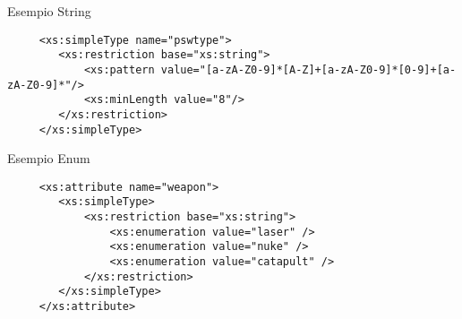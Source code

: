 \documentclass{beamer}
\begin{document}
   \begin{frame}[containsverbatim]
   \begin{block}{Esempio String}
      \begin{lstlisting}
     <xs:simpleType name="pswtype">
     	<xs:restriction base="xs:string">
     		<xs:pattern value="[a-zA-Z0-9]*[A-Z]+[a-zA-Z0-9]*[0-9]+[a-zA-Z0-9]*"/>
     		<xs:minLength value="8"/>
     	</xs:restriction>
     </xs:simpleType>
  	\end{lstlisting}
   \end{block}
   \end{frame}   
   \begin{frame}[containsverbatim]
   \begin{block}{Esempio Enum}
      \begin{lstlisting}
     <xs:attribute name="weapon">
     	<xs:simpleType>
     		<xs:restriction base="xs:string">
     			<xs:enumeration value="laser" />
     			<xs:enumeration value="nuke" />
     			<xs:enumeration value="catapult" />
     		</xs:restriction>
     	</xs:simpleType>
     </xs:attribute>
	\end{lstlisting}
   \end{block}
   \end{frame}
\end{document}
